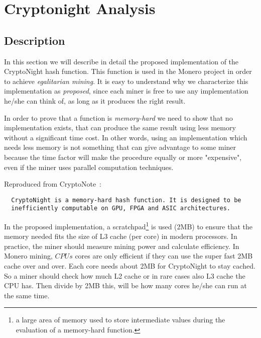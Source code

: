 
\chapter{Cryptonight Analysis}
%
%
\section{Description}
In this section we will describe in detail the proposed implementation of the CryptoNight hash function. This function is used in the Monero project in order to achieve \emph{egalitarian mining}. It is easy to understand why we characterize this implementation as \emph{proposed}, since each miner is free to use any implementation he/she can think of, as long as it produces the right result.

In order to prove that a function is \emph{memory-hard} we need to show that no implementation exists, that can produce the same result using less memory without a significant time cost. In other words, using an implementation which needs less memory is not something that can give advantage to some miner because the time factor will make the procedure equally or more "expensive", even if the miner uses parallel computation techniques.

\noindent Reproduced from CryptoNote~\cite{cryptonight}:
\begin{verbatim}
  CryptoNight is a memory-hard hash function. It is designed to be
  inefficiently computable on GPU, FPGA and ASIC architectures.
\end{verbatim}
In the proposed implementation, a scratchpad\footnote{a large area of memory used to store intermediate values during the evaluation of a memory-hard function.} is used (2MB) to ensure that the memory needed fits the size of L3 cache (per core) in modern processors. In practice, the miner should measure mining power and calculate efficiency. In Monero mining, $CPUs$ cores are only efficient if they can use the super fast 2MB cache over and over. Each core needs about 2MB for CryptoNight to stay cached. So a miner should check how much L2 cache or in rare cases also L3 cache the CPU has. Then divide by 2MB this, will be how many cores he/she can run at the same time.

